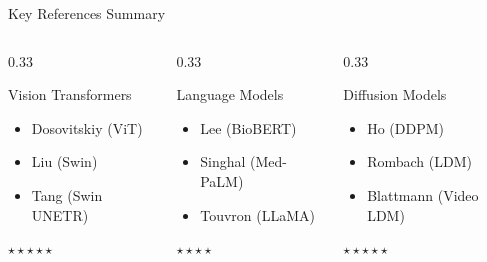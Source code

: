 \documentclass[aspectratio=169]{beamer}
\begin{document}
\begin{frame}{Key References Summary}
    \footnotesize
    \begin{columns}
        \begin{column}{0.33\textwidth}
            \begin{block}{Vision Transformers}
                \begin{itemize}
                    \item Dosovitskiy (ViT)
                    \item Liu (Swin)
                    \item Tang (Swin UNETR)
                \end{itemize}
                \centering $\star\star\star\star\star$
            \end{block}
        \end{column}
        \begin{column}{0.33\textwidth}
            \begin{block}{Language Models}
                \begin{itemize}
                    \item Lee (BioBERT)
                    \item Singhal (Med-PaLM)
                    \item Touvron (LLaMA)
                \end{itemize}
                \centering $\star\star\star\star$
            \end{block}
        \end{column}
        \begin{column}{0.33\textwidth}
            \begin{block}{Diffusion Models}
                \begin{itemize}
                    \item Ho (DDPM)
                    \item Rombach (LDM)
                    \item Blattmann (Video LDM)
                \end{itemize}
                \centering $\star\star\star\star\star$
            \end{block}
        \end{column}
    \end{columns}
    

\end{frame}
\end{document}
